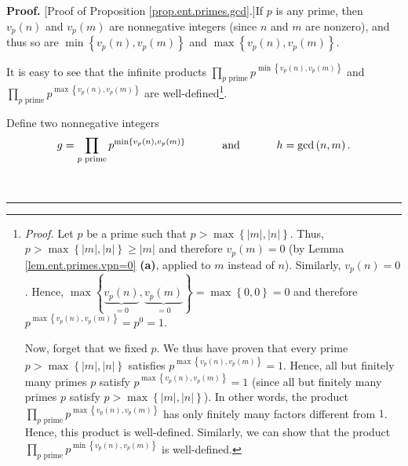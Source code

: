 \documentclass[numbers=enddot,12pt,final,onecolumn,notitlepage]{scrartcl}%
\numberwithin{exer}{subsection}
\theoremstyle{definition}
\newenvironment{proof}[1][Proof]{\noindent\textbf{#1.} }{\ \rule{0.5em}{0.5em}}
\let\prodnonlimits\prod
\renewcommand{\prod}{\prodnonlimits\limits}
\begin{document}
\begin{proof}
[Proof of Proposition \ref{prop.ent.primes.gcd}.]If $p$ is any prime, then
$v_{p}\left(  n\right)  $ and $v_{p}\left(  m\right)  $ are nonnegative
integers (since $n$ and $m$ are nonzero), and thus so are $\min\left\{
v_{p}\left(  n\right)  ,v_{p}\left(  m\right)  \right\}  $ and $\max\left\{
v_{p}\left(  n\right)  ,v_{p}\left(  m\right)  \right\}  $.

It is easy to see that the infinite products $\prod_{p\text{ prime}}%
p^{\min\left\{  v_{p}\left(  n\right)  ,v_{p}\left(  m\right)  \right\}  }$
and \newline$\prod_{p\text{ prime}}p^{\max\left\{  v_{p}\left(  n\right)
,v_{p}\left(  m\right)  \right\}  }$ are well-defined\footnote{\textit{Proof.}
Let $p$ be a prime such that $p>\max\left\{  \left\vert m\right\vert
,\left\vert n\right\vert \right\}  $. Thus, $p>\max\left\{  \left\vert
m\right\vert ,\left\vert n\right\vert \right\}  \geq\left\vert m\right\vert $
and therefore $v_{p}\left(  m\right)  =0$ (by Lemma \ref{lem.ent.primes.vpn=0}
\textbf{(a)}, applied to $m$ instead of $n$). Similarly, $v_{p}\left(
n\right)  =0$. Hence, $\max\left\{  \underbrace{v_{p}\left(  n\right)  }%
_{=0},\underbrace{v_{p}\left(  m\right)  }_{=0}\right\}  =\max\left\{
0,0\right\}  =0$ and therefore $p^{\max\left\{  v_{p}\left(  n\right)
,v_{p}\left(  m\right)  \right\}  }=p^{0}=1$.
\par
Now, forget that we fixed $p$. We thus have proven that every prime
$p>\max\left\{  \left\vert m\right\vert ,\left\vert n\right\vert \right\}  $
satisfies $p^{\max\left\{  v_{p}\left(  n\right)  ,v_{p}\left(  m\right)
\right\}  }=1$. Hence, all but finitely many primes $p$ satisfy $p^{\max
\left\{  v_{p}\left(  n\right)  ,v_{p}\left(  m\right)  \right\}  }=1$ (since
all but finitely many primes $p$ satisfy $p>\max\left\{  \left\vert
m\right\vert ,\left\vert n\right\vert \right\}  $). In other words, the
product $\prod_{p\text{ prime}}p^{\max\left\{  v_{p}\left(  n\right)
,v_{p}\left(  m\right)  \right\}  }$ has only finitely many factors different
from $1$. Hence, this product is well-defined. Similarly, we can show that the
product $\prod_{p\text{ prime}}p^{\min\left\{  v_{p}\left(  n\right)
,v_{p}\left(  m\right)  \right\}  }$ is well-defined.}.

Define two nonnegative integers%
\begin{equation}
g=\prod\limits_{p\text{ prime}}p^{\min\left\{  v_{p}\left(  n\right)
,v_{p}\left(  m\right)  \right\}  }\ \ \ \ \ \ \ \ \ \ \text{and}%
\ \ \ \ \ \ \ \ \ \ h=\gcd\left(  n,m\right)  .
\label{pf.prop.ent.primes.gcd.g=h=}%
\end{equation}



\end{proof}
\end{document}
